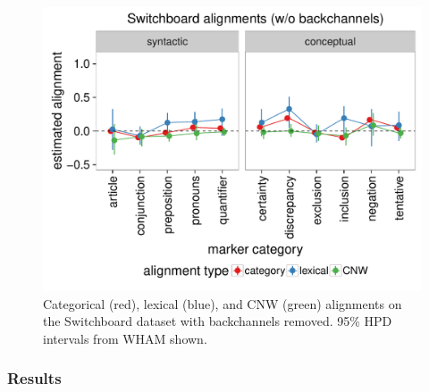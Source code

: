 \documentclass[11pt]{article}
\begin{document}
\begin{figure}[t]
  \begin{center}
    \includegraphics[width=\columnwidth]{results/swbdn_line.pdf}
  \end{center}
  \caption{Categorical (red), lexical (blue), and CNW (green) alignments on the Switchboard dataset with backchannels removed. 95\% HPD intervals from WHAM shown.}\label{fig:swbdn-res}
\end{figure}

\subsubsection{Results}



%

%
%
\newpage



\appendix

\end{document}
